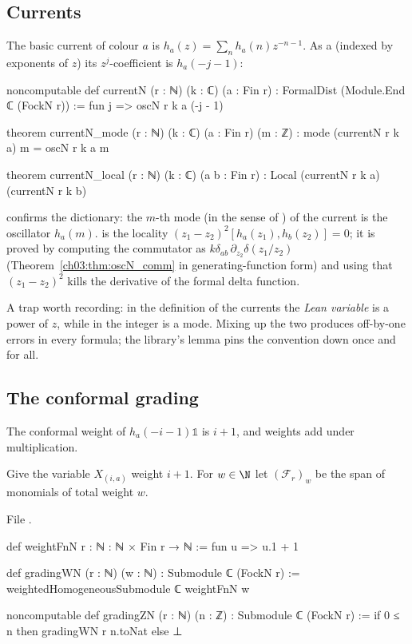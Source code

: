 \subsection{Currents}

The basic current of colour $a$ is $h_a(z)=\sum_n h_a(n)z^{-n-1}$. As a 
(indexed by exponents of $z$) its $z^j$-coefficient is $h_a(-j-1)$:
\begin{leancode}
noncomputable def currentN (r : ℕ) (k : ℂ) (a : Fin r) :
    FormalDist (Module.End ℂ (FockN r)) := fun j => oscN r k a (-j - 1)

theorem currentN_mode (r : ℕ) (k : ℂ) (a : Fin r) (m : ℤ) :
    mode (currentN r k a) m = oscN r k a m

theorem currentN_local (r : ℕ) (k : ℂ) (a b : Fin r) :
    Local (currentN r k a) (currentN r k b)
\end{leancode}
 confirms the dictionary: the $m$-th mode (in the sense of ) of
the current is the oscillator $h_a(m)$.  is the locality
$(z_1-z_2)^2[h_a(z_1),h_b(z_2)]=0$; it is proved by computing the commutator as
$k\delta_{ab}\,\partial_{z_2}\delta(z_1/z_2)$ (Theorem~\ref{ch03:thm:oscN_comm} in generating-function
form) and using that $(z_1-z_2)^2$ kills the derivative of the formal delta function.

A trap worth recording: in the definition of the currents the \emph{Lean variable}  is a
power of $z$, while in  the integer  is a mode. Mixing up the two produces
off-by-one errors in every formula; the library's lemma  pins the convention
down once and for all.

\subsection{The conformal grading}

The conformal weight of $h_a(-i-1)\mathbb 1$ is $i+1$, and weights add under multiplication.

\begin{definition}\label{ch03:def:gradingWN}
Give the variable $X_{(i,a)}$ weight $i+1$. For $w\in\N$ let $(\mathcal F_r)_w$ be the span of
monomials of total weight $w$.
\end{definition}
\noindent File .
\begin{leancode}
def weightFnN {r : ℕ} : ℕ × Fin r → ℕ := fun u => u.1 + 1

def gradingWN (r : ℕ) (w : ℕ) : Submodule ℂ (FockN r) :=
  weightedHomogeneousSubmodule ℂ weightFnN w

noncomputable def gradingZN (r : ℕ) (n : ℤ) : Submodule ℂ (FockN r) :=
  if 0 ≤ n then gradingWN r n.toNat else ⊥
\end{leancode}

